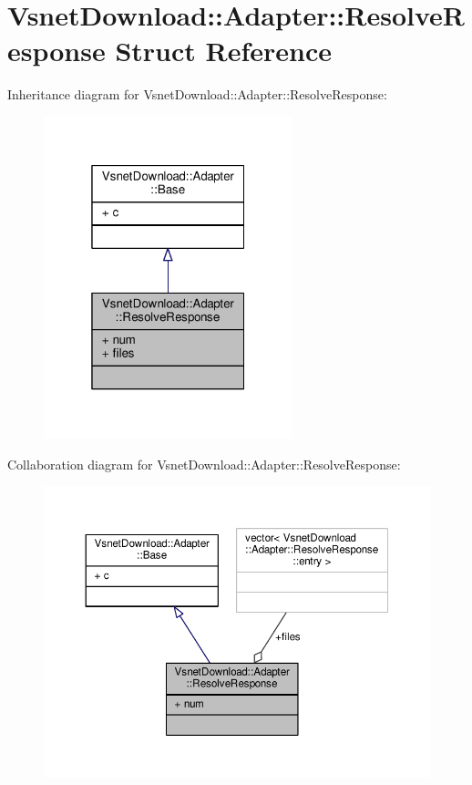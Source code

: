 \hypertarget{structVsnetDownload_1_1Adapter_1_1ResolveResponse}{}\section{Vsnet\+Download\+:\+:Adapter\+:\+:Resolve\+Response Struct Reference}
\label{structVsnetDownload_1_1Adapter_1_1ResolveResponse}


Inheritance diagram for Vsnet\+Download\+:\+:Adapter\+:\+:Resolve\+Response\+:
\nopagebreak
\begin{figure}[H]
\begin{center}
\leavevmode
\includegraphics[width=205pt]{dd/de7/structVsnetDownload_1_1Adapter_1_1ResolveResponse__inherit__graph}
\end{center}
\end{figure}


Collaboration diagram for Vsnet\+Download\+:\+:Adapter\+:\+:Resolve\+Response\+:
\nopagebreak
\begin{figure}[H]
\begin{center}
\leavevmode
\includegraphics[width=350pt]{d7/dfa/structVsnetDownload_1_1Adapter_1_1ResolveResponse__coll__graph}
\end{center}
\end{figure}
